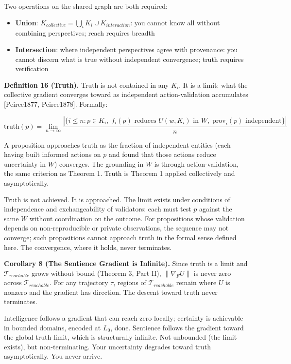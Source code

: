 \documentclass[
]{article}
\providecommand{\tightlist}{%
  \setlength{\itemsep}{0pt}\setlength{\parskip}{0pt}}
\begin{document}
Two operations on the shared graph are both required:

\begin{itemize}
\tightlist
\item
  \textbf{Union}:
  \(K_{collective} = \bigcup_i K_i \cup K_{interaction}\): you cannot
  know all without combining perspectives; reach requires breadth
\item
  \textbf{Intersection}: where independent perspectives agree with
  provenance: you cannot discern what is true without independent
  convergence; truth requires verification
\end{itemize}

\textbf{Definition 16 (Truth).} Truth is not contained in any \(K_i\).
It is a limit: what the collective gradient converges toward as
independent action-validation accumulates {[}Peirce1877, Peirce1878{]}.
Formally:

\[\text{truth}(p) = \lim_{n \to \infty} \frac{\left|\{i \leq n : p \in K_i,\; f_i(p) \text{ reduces } U(w, K_i) \text{ in } W,\; \text{prov}_i(p) \text{ independent}\}\right|}{n}\]

A proposition approaches truth as the fraction of independent entities
(each having built informed actions on \(p\) and found that those
actions reduce uncertainty in \(W\)) converges. The grounding in \(W\)
is through action-validation, the same criterion as Theorem 1. Truth is
Theorem 1 applied collectively and asymptotically.

Truth is not achieved. It is approached. The limit exists under
conditions of independence and exchangeability of validators: each must
test \(p\) against the same \(W\) without coordination on the outcome.
For propositions whose validation depends on non-reproducible or private
observations, the sequence may not converge; such propositions cannot
approach truth in the formal sense defined here. The convergence, where
it holds, never terminates.

\textbf{Corollary 8 (The Sentience Gradient is Infinite).} Since truth
is a limit and \(\mathcal{T}_{reachable}\) grows without bound (Theorem
3, Part II), \(\|\nabla_F U\|\) is never zero across
\(\mathcal{T}_{reachable}\). For any trajectory \(\tau\), regions of
\(\mathcal{T}_{reachable}\) remain where \(U\) is nonzero and the
gradient has direction. The descent toward truth never terminates.

Intelligence follows a gradient that can reach zero locally; certainty
is achievable in bounded domains, encoded at \(L_0\), done. Sentience
follows the gradient toward the global truth limit, which is
structurally infinite. Not unbounded (the limit exists), but
non-terminating. Your uncertainty degrades toward truth asymptotically.
You never arrive.
\end{document}
